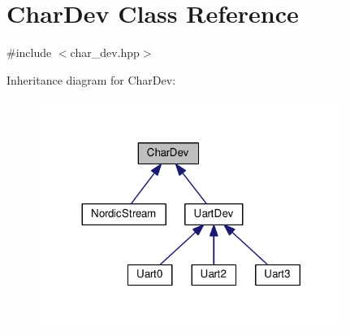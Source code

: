 \hypertarget{classCharDev}{}\section{Char\+Dev Class Reference}
\label{classCharDev}


{\ttfamily \#include $<$char\+\_\+dev.\+hpp$>$}



Inheritance diagram for Char\+Dev\+:\nopagebreak
\begin{figure}[H]
\begin{center}
\leavevmode
\includegraphics[width=281pt]{d3/d84/classCharDev__inherit__graph}
\end{center}
\end{figure}
